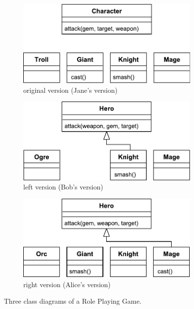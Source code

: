 \begin{figure}[t]
  \centering
  \begin{subfigure}[t]{0.31\linewidth}
    \includegraphics[width=\linewidth]{class_diagram_origin}
    \caption{original version (Jane's version)}
    \label{fig:class_diagram_origin}
  \end{subfigure}
  \hfill
  \begin{subfigure}[t]{0.31\linewidth}
    \includegraphics[width=\linewidth]{class_diagram_left}
    \caption{left version (Bob's version)}
    \label{fig:class_diagram_left}
  \end{subfigure}
  \hfill
  \begin{subfigure}[t]{0.31\linewidth}
    \includegraphics[width=\linewidth]{class_diagram_right}
    \caption{right version (Alice's version)}
    \label{fig:class_diagram_right}
  \end{subfigure}
  \caption{Three class diagrams of a Role Playing Game.}
  \label{fig:class_diagram_rpg}
\end{figure}

